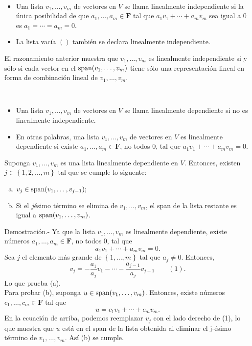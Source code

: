 \begin{mydef}\,\\
    \begin{itemize}
	\item Una lista $v_1,\ldots,v_m$ de vectores en $V$ se llama linealmente independiente si la única posibilidad de que  $a_1,\ldots,a_m\in \textbf{F}$ tal que $a_1v_1+\cdots+a_mv_m$ sea igual a $0$ es $a_1=\cdots=a_m=0.$
	\item La lista vacía $()$ también se declara linealmente independiente.
    \end{itemize}
\end{mydef}

El razonamiento anterior muestra que $v_1,\ldots,v_m$ es linealmente independiente si y sólo si cada vector en el $\mathop{\mbox{\normalfont span}}\nolimits(v_1,\ldots,v_m)$ tiene sólo una representación lineal en forma de combinación lineal de $v_1,\ldots,v_m$.

\setcounter{mydef}{18}
\begin{mydef}\,\\
    \begin{itemize}
	\item Una lista $v_1,\ldots,v_m$ de vectores en $V$ se llama linealmente dependiente si no es linealmente independiente.
	\item En otras palabras, una lista $v_1,\ldots,v_m$ de vectores en $V$ es linealmente dependiente si existe $a_1,\ldots,a_m\in \textbf{F}$, no todos $0$, tal que $a_1v_1+\cdots+a_mv_m=0$.
    \end{itemize}
\end{mydef}

\setcounter{mylema}{20}
\begin{mylema}
    Suponga $v_1,\ldots,v_m$ es una lista linealmente dependiente en $V$. Entonces, existen $j\in\left\{1,2,\ldots,m\right\}$ tal que se cumple lo siguente:
    \begin{enumerate}[(a)]
	\item $v_j\in \mathop{\mbox{\normalfont span}}\nolimits(v_1,\ldots,v_{j-1});$
	\item Si el $j$ésimo término se elimina de $v_1,\ldots,v_m$, el span de la lista restante es igual a $\mathop{\mbox{\normalfont span}}\nolimits(v_1,\ldots,v_m)$.\\
    \end{enumerate}
    Demostración.-\; Ya que la lista $v_1,\ldots,v_m$ es linealmente dependiente, existe números $a_1,\ldots,a_m\in \textbf{F}$, no todos $0$, tal que
    $$a_1v_1+\cdots + a_mv_m=0.$$
    Sea $j$ el elemento más grande de $\left\{1,\ldots, m\right\}$ tal que $a_j\neq 0$. Entonces,
    $$v_j=-\dfrac{a_1}{a_j}v_1-\cdots-\dfrac{a_{j-1}}{a_j}v_{j-1}\qquad (1).$$
    Lo que prueba (a). \\
    Para probar (b), suponga $u\in \mathop{\mbox{\normalfont span}}\nolimits(v_1,\ldots,v_m)$. Entonces, existe números $c_1,\ldots,c_m\in \textbf{F}$ tal que
    $$u=c_1v_1+\cdots+c_mv_m.$$
    En la ecuación de arriba, podemos reemplazar $v_j$ con el lado derecho de (1), lo que muestra que $u$ está en el span de la lista obtenida al eliminar el j-ésimo término de $v_1,\ldots,v_m$. Así (b) se cumple.
\end{mylema}

